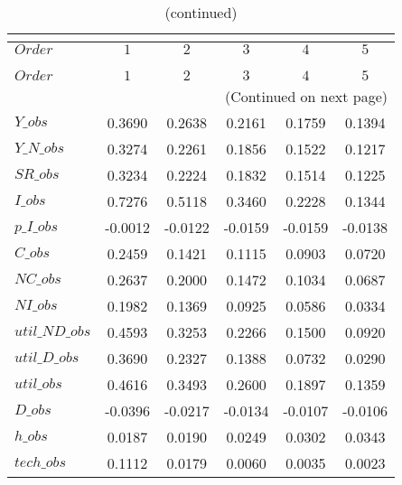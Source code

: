  
\begin{center}
\begin{longtable}{lccccc} 
\caption{COEFFICIENTS OF AUTOCORRELATION}\\
 \label{Table:th_autocorr_matrix}\\
\toprule 
$Order          $	 & 	 $          1$	 & 	 $          2$	 & 	 $          3$	 & 	 $          4$	 & 	 $          5$\\
\midrule \endfirsthead 
\caption{(continued)}\\
 \toprule \\ 
$Order          $	 & 	 $          1$	 & 	 $          2$	 & 	 $          3$	 & 	 $          4$	 & 	 $          5$\\
\midrule \endhead 
\midrule \multicolumn{6}{r}{(Continued on next page)} \\ \bottomrule \endfoot 
\bottomrule \endlastfoot 
$Y\_obs         $	 & 	     0.3690	 & 	     0.2638	 & 	     0.2161	 & 	     0.1759	 & 	     0.1394 \\ 
$Y\_N\_obs      $	 & 	     0.3274	 & 	     0.2261	 & 	     0.1856	 & 	     0.1522	 & 	     0.1217 \\ 
$SR\_obs        $	 & 	     0.3234	 & 	     0.2224	 & 	     0.1832	 & 	     0.1514	 & 	     0.1225 \\ 
$I\_obs         $	 & 	     0.7276	 & 	     0.5118	 & 	     0.3460	 & 	     0.2228	 & 	     0.1344 \\ 
$p\_I\_obs      $	 & 	    -0.0012	 & 	    -0.0122	 & 	    -0.0159	 & 	    -0.0159	 & 	    -0.0138 \\ 
$C\_obs         $	 & 	     0.2459	 & 	     0.1421	 & 	     0.1115	 & 	     0.0903	 & 	     0.0720 \\ 
$NC\_obs        $	 & 	     0.2637	 & 	     0.2000	 & 	     0.1472	 & 	     0.1034	 & 	     0.0687 \\ 
$NI\_obs        $	 & 	     0.1982	 & 	     0.1369	 & 	     0.0925	 & 	     0.0586	 & 	     0.0334 \\ 
$util\_ND\_obs  $	 & 	     0.4593	 & 	     0.3253	 & 	     0.2266	 & 	     0.1500	 & 	     0.0920 \\ 
$util\_D\_obs   $	 & 	     0.3690	 & 	     0.2327	 & 	     0.1388	 & 	     0.0732	 & 	     0.0290 \\ 
$util\_obs      $	 & 	     0.4616	 & 	     0.3493	 & 	     0.2600	 & 	     0.1897	 & 	     0.1359 \\ 
$D\_obs         $	 & 	    -0.0396	 & 	    -0.0217	 & 	    -0.0134	 & 	    -0.0107	 & 	    -0.0106 \\ 
$h\_obs         $	 & 	     0.0187	 & 	     0.0190	 & 	     0.0249	 & 	     0.0302	 & 	     0.0343 \\ 
$tech\_obs      $	 & 	     0.1112	 & 	     0.0179	 & 	     0.0060	 & 	     0.0035	 & 	     0.0023 \\ 
\end{longtable}
 \end{center}
